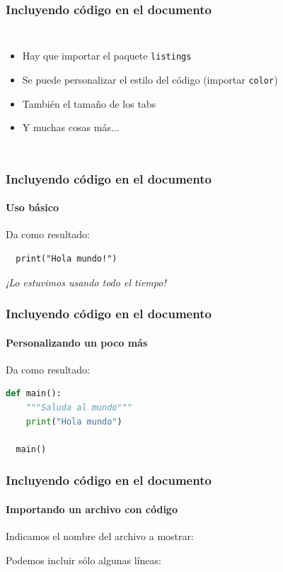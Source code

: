\documentclass[svgnames]{beamer}
\begin{document}
\begin{frame}
  \frametitle{Incluyendo código en el documento}
  \begin{columns}
    \centering
      
    \centering
      \begin{itemize}
        \item Hay que importar el paquete \texttt{listings}
        \item Se puede personalizar el estilo del código (importar \texttt{color})
        \item También el tamaño de los tabs
        \item Y muchas cosas más...
      \end{itemize}
  \end{columns}
\end{frame}


\begin{frame}[fragile]
  \frametitle{Incluyendo código en el documento}
  \framesubtitle{Uso básico}
  

  \vfill

  Da como resultado:
  \begin{lstlisting}
  print("Hola mundo!")
  \end{lstlisting}\pause

  \vfill

  \begin{center}
    \emph{¡Lo estuvimos usando todo el tiempo!}
  \end{center}
\end{frame}

\begin{frame}[fragile]
  \frametitle{Incluyendo código en el documento}
  \framesubtitle{Personalizando un poco más}
  

  \vfill

  Da como resultado:
  \begin{lstlisting}[language=python]
  def main():
    """Saluda al mundo"""
    print("Hola mundo")
  
  main()
  \end{lstlisting}
\end{frame}

\begin{frame}[fragile]
  \frametitle{Incluyendo código en el documento}
  \framesubtitle{Importando un archivo con código}
  Indicamos el nombre del archivo a mostrar:
  \pause

  \vfill

  Podemos incluir sólo algunas líneas:
  

\end{frame}
\end{document}
